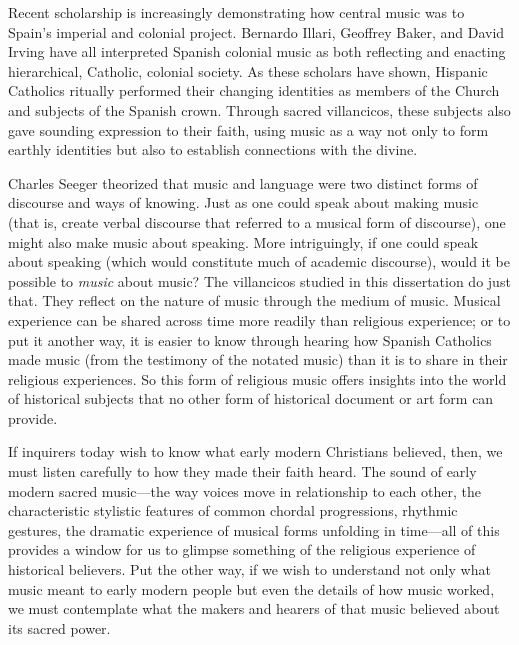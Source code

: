 Recent scholarship is increasingly demonstrating how central music was to Spain's imperial and colonial project.
Bernardo Illari, Geoffrey Baker, and David Irving have all interpreted Spanish colonial music as both reflecting and enacting hierarchical, Catholic, colonial society.%
	\autocites{Illari:Polychoral}{Baker:Harmony}{Irving:Colonial}
As these scholars have shown, Hispanic Catholics ritually performed their changing identities as members of the Church and subjects of the Spanish crown. 
Through sacred villancicos, these subjects also gave sounding expression to their faith, using music as a way not only to form earthly identities but also to establish connections with the divine.

Charles Seeger theorized that music and language were two distinct forms of discourse and ways of knowing.%
	\autocite{Seeger:Unitary}
Just as one could speak about making music (that is, create verbal discourse that referred to a musical form of discourse), one might also make music about speaking.
More intriguingly, if one could speak about speaking (which would constitute much of academic discourse), would it be possible to \emph{music} about music? 
The villancicos studied in this dissertation do just that. 
They reflect on the nature of music through the medium of music.
Musical experience can be shared across time more readily than religious experience; or to put it another way, it is easier to know through hearing how Spanish Catholics made music (from the testimony of the notated music) than it is to share in their religious experiences.
So this form of religious music offers insights into the world of historical subjects that no other form of historical document or art form can provide.

If inquirers today wish to know what early modern Christians believed, then, we must listen carefully to how they made their faith heard.
The sound of early modern sacred music---the way voices move in relationship to each other, the characteristic stylistic features of common chordal progressions, rhythmic gestures, the dramatic experience of musical forms unfolding in time---all of this provides a window for us to glimpse something of the religious experience of historical believers.
Put the other way, if we wish to understand not only what music meant to early modern people but even the details of how music worked, we must contemplate what the makers and hearers of that music believed about its sacred power. 


